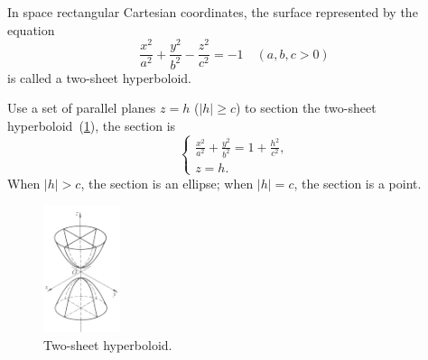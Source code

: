 \documentclass[11pt]{../../TexTemplate/elegantbook} %
\begin{document}
In space rectangular Cartesian coordinates, 
the surface represented by the equation
\[
\frac{x^{2}}{a^{2}} + \frac{y^{2}}{b^{2}} - \frac{z^{2}}{c^{2}} = -1\quad (a,b,c > 0)
\]
is called a two-sheet hyperboloid.

\vspace{0.7cm}
Use a set of parallel planes \(z=h\) (\(|h|\geqslant c\)) to section the two-sheet hyperboloid~(\ref{fig:TwoSheetHyperboloid}), 
the section is
\[
\begin{cases} \frac{x^{2}}{a^{2}} + \frac{y^{2}}{b^{2}} = 1 + \frac{h^{2}}{c^{2}}, \\ z=h. \end{cases}
\]
When \(|h| > c\), the section is an ellipse;\newline
when \(|h| = c\), the section is a point.
\begin{figure}[h]
    \centering
    \includegraphics[width=0.2\textwidth]{img/two-sheet-hyperbloid.png}
    \caption{Two-sheet hyperboloid.}
    \label{fig:TwoSheetHyperboloid}
\end{figure}
\end{document}
